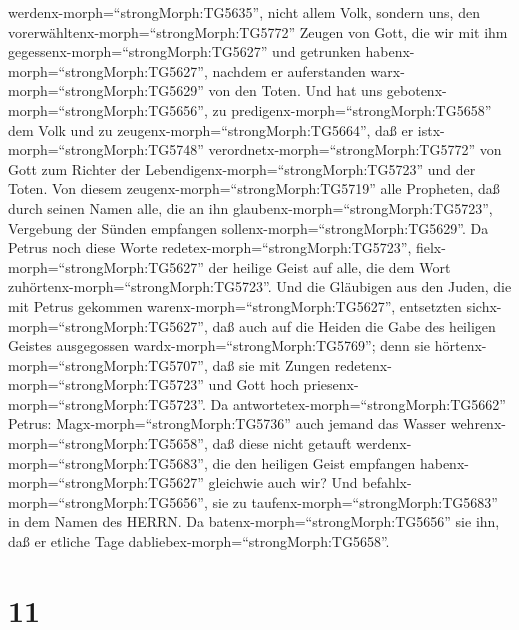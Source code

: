 werdenx-morph=``strongMorph:TG5635'',  nicht allem Volk,
sondern uns, den vorerwähltenx-morph=``strongMorph:TG5772'' Zeugen von
Gott, die wir mit ihm gegessenx-morph=``strongMorph:TG5627'' und
getrunken habenx-morph=``strongMorph:TG5627'', nachdem er auferstanden
warx-morph=``strongMorph:TG5629'' von den Toten.  Und hat
uns gebotenx-morph=``strongMorph:TG5656'', zu
predigenx-morph=``strongMorph:TG5658'' dem Volk und zu
zeugenx-morph=``strongMorph:TG5664'', daß er
istx-morph=``strongMorph:TG5748''
verordnetx-morph=``strongMorph:TG5772'' von Gott zum Richter der
Lebendigenx-morph=``strongMorph:TG5723'' und der Toten. 
Von diesem zeugenx-morph=``strongMorph:TG5719'' alle Propheten, daß
durch seinen Namen alle, die an ihn
glaubenx-morph=``strongMorph:TG5723'', Vergebung der Sünden empfangen
sollenx-morph=``strongMorph:TG5629''.  Da Petrus noch diese
Worte redetex-morph=``strongMorph:TG5723'',
fielx-morph=``strongMorph:TG5627'' der heilige Geist auf alle, die dem
Wort zuhörtenx-morph=``strongMorph:TG5723''.  Und die
Gläubigen aus den Juden, die mit Petrus gekommen
warenx-morph=``strongMorph:TG5627'', entsetzten
sichx-morph=``strongMorph:TG5627'', daß auch auf die Heiden die Gabe des
heiligen Geistes ausgegossen wardx-morph=``strongMorph:TG5769'';
 denn sie hörtenx-morph=``strongMorph:TG5707'', daß sie mit
Zungen redetenx-morph=``strongMorph:TG5723'' und Gott hoch
priesenx-morph=``strongMorph:TG5723''. Da
antwortetex-morph=``strongMorph:TG5662'' Petrus: 
Magx-morph=``strongMorph:TG5736'' auch jemand das Wasser
wehrenx-morph=``strongMorph:TG5658'', daß diese nicht getauft
werdenx-morph=``strongMorph:TG5683'', die den heiligen Geist empfangen
habenx-morph=``strongMorph:TG5627'' gleichwie auch wir? 
Und befahlx-morph=``strongMorph:TG5656'', sie zu
taufenx-morph=``strongMorph:TG5683'' in dem Namen des HERRN. Da
batenx-morph=``strongMorph:TG5656'' sie ihn, daß er etliche Tage
dabliebex-morph=``strongMorph:TG5658''.

\hypertarget{section-10}{%
\section{11}\label{section-10}}

